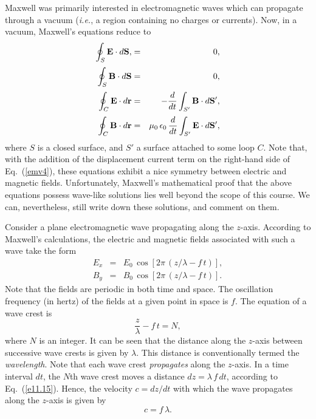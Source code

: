 Maxwell was primarily interested in electromagnetic
waves which can propagate through a vacuum ({\em i.e.},
a region containing no charges or currents). 
Now, in a vacuum, Maxwell's equations
 reduce to
\begin{eqnarray}
\oint_S {\bf E}\cdot d{\bf S},&= & 0,\label{emv1}\\[0.5ex]
\oint_S {\bf B}\cdot d{\bf S} &=& 0,\label{emv2}\\[0.5ex]
\oint_C {\bf E}\cdot d{\bf r}&=& - \frac{d}{dt}\int_{S'}{\bf B}\cdot d{\bf S}',\label{emv3}
\\[0.5ex]
\oint_C {\bf B}\cdot d{\bf r} &=& \mu_0\,
\epsilon_0\,\frac{d}{dt}\int_{S'} {\bf E}\cdot d {\bf S}',\label{emv4}
\end{eqnarray}
where $S$ is a closed surface, and $S'$ a surface attached to some loop $C$.
Note that, with the addition of the displacement current term
on the right-hand side of Eq.~(\ref{emv4}), these equations
exhibit a nice symmetry between electric and magnetic fields. 
Unfortunately, Maxwell's mathematical proof that the above
equations possess
wave-like solutions lies well beyond the scope of this course. We can, nevertheless,
still write down these solutions, and comment on them.

Consider a plane electromagnetic wave propagating along the
$z$-axis. According to Maxwell's calculations, the electric and
magnetic fields associated with such a wave take the form
\begin{eqnarray}\label{e11.14}
E_x &=& E_0\,\cos[2\pi\,(z/\lambda - f\,t)],\\[0.5ex]
B_y &=& B_0\,\cos[2\pi\,(z/\lambda-f\,t)].
\end{eqnarray}
Note that the fields are periodic in both time and space. 
The
oscillation frequency (in hertz) of the fields at a given point
in space is $f$.
The equation
of a wave crest is 
\begin{equation}\label{e11.15}
\frac{z}{\lambda} - f\,t = N,
\end{equation}
where $N$ is an integer. It can be seen that the distance along the
$z$-axis between successive wave crests is given by $\lambda$. This
distance is conventionally termed the {\em wavelength}.
Note that each  wave crest {\em propagates} along  
the $z$-axis. In a time interval $dt$, the $N$th wave
crest moves a distance $d z = \lambda\,f\,d t$,
according to Eq.~(\ref{e11.15}). Hence, the velocity  $c = d z/d t$
with which the wave propagates along the $z$-axis is given by
\begin{equation}
c = f\,\lambda.
\end{equation}

